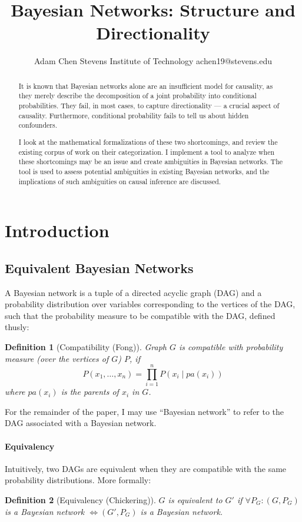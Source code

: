 \documentclass{article}
\title{Bayesian Networks: Structure and Directionality}
\author{
	Adam Chen
	\affiliations
	Stevens Institute of Technology
	\emails
	achen19@stevens.edu
}
\newtheorem{definition}{Definition}
\begin{document}
	
	\maketitle
	
	\begin{abstract}
		It is known that Bayesian networks alone are an insufficient model for causality, as they merely describe the decomposition of a joint probability into conditional probabilities.
		They fail, in most cases, to capture directionality --- a crucial aspect of causality.
		Furthermore, conditional probability fails to tell us about hidden confounders.
		
		I look at the mathematical formalizations of these two shortcomings, and review the existing corpus of work on their categorization.
		I implement a tool to analyze when these shortcomings may be an issue and create ambiguities in Bayesian networks.
		The tool is used to assess potential ambiguities in existing Bayesian networks, and the implications of such ambiguities on causal inference are discussed.
	\end{abstract}
	
		
	\section{Introduction}
	\subsection{Equivalent Bayesian Networks}
	A Bayesian network is a tuple of a directed acyclic graph (DAG) and a probability distribution over variables corresponding to the vertices of the DAG, such that the probability measure to be compatible with the DAG, defined thusly:
	\begin{definition}[Compatibility (Fong)\cite{fong2013causal}]
		Graph $G$ is compatible with probability measure (over the vertices of $G$) $P$, if
		$$
		P(x_1, \dots, x_n) = \prod_{i=1}^n{P(x_i \mid pa(x_i))}
		$$
		where $pa(x_i)$ is the parents of $x_i$ in $G$.
	\end{definition}
	For the remainder of the paper, I may use ``Bayesian network'' to refer to the DAG associated with a Bayesian network.
	
	\paragraph{Equivalency} Intuitively, two DAGs are equivalent when they are compatible with the same probability distributions. More formally:
	\begin{definition}[Equivalency (Chickering)\cite{chickering2013transformational}]
		$G$ is equivalent to $G'$ if $\forall P_G: (G, P_G)$ is a Bayesian network $\iff (G', P_G)$ is a Bayesian network.
	\end{definition}
	
\end{document}
